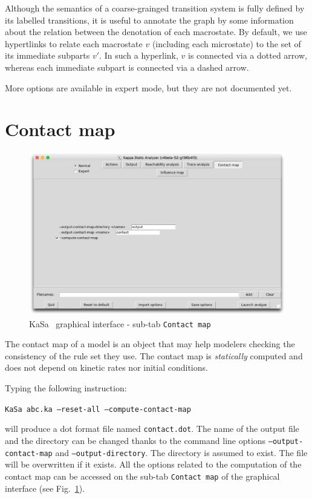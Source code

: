\documentclass[11pt]{book}
\def\KaSa{\textsf{KaSa}}
\begin{document}
Although the semantics of a coarse-grainged transition system is fully defined  by its labelled transitions, it is useful to annotate the graph by some information about the relation between the denotation of each macrostate. By default, we use hypertlinks to relate each macrostate $v$ (including each microstate)
 to the set of its immediate subparts $v'$. In such a hyperlink, $v$ is connected via a dotted arrow, whereas each immediate subpart is connected via a dashed arrow.

 More options are available in expert mode, but they are not documented yet.

\section{Contact map}

\begin{figure}[htbp]
\centering
\includegraphics[width=12cm,bb=0 0 1904 1208]{img/kasa_4.png}
\caption{\KaSa~ graphical interface - sub-tab \texttt{Contact map}}
\label{fig:kasa:4}
\end{figure}

The contact map of a model is an object that may help modelers checking the consistency of the rule set they use. The contact map is \emph{statically} computed and does not depend on kinetic rates nor initial conditions.


Typing the following instruction:

\texttt{KaSa abc.ka --reset-all --compute-contact-map}

will produce a dot format file named \texttt{contact.dot}.
The name of the output file and the directory can be changed thanks to the command line options \texttt{--output-contact-map} and \texttt{--output-directory}.
The directory is assumed to exist. The file will be overwritten if it exists. All the options related to the computation of the contact map can be accessed on the
sub-tab \texttt{Contact map} of the graphical interface (see Fig.~\ref{fig:kasa:4}).
\end{document}
